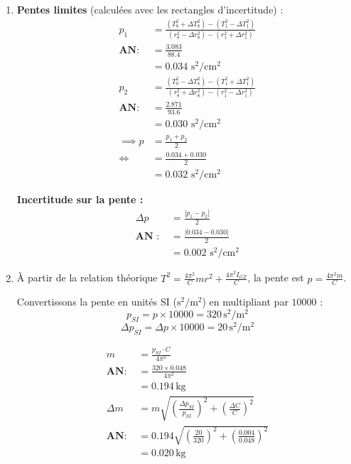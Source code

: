 \begin{enumerate}
    \item 
    \textbf{Pentes limites} (calculées avec les rectangles d'incertitude) :
    \begin{align*}
    p_1 &= \frac{(T^2_8 + \Delta T^2_8) - (T^2_1 - \Delta T^2_1)}{(r^2_8 - \Delta r^2_8) - (r^2_1 + \Delta r^2_1)}  \\
    \textbf{AN: } & = \frac{3.083}{88.4} \\
    & = 0.034 \text{ s}^2/\text{cm}^2\\
    p_2 &= \frac{(T^2_8 - \Delta T^2_8) - (T^2_1 + \Delta T^2_1)}{(r^2_8 + \Delta r^2_8) - (r^2_1 - \Delta r^2_1)}  \\
    \textbf{AN: } & = \frac{2.871}{93.6} \\
    & = 0.030 \text{ s}^2/\text{cm}^2\\
    \implies p & = \frac{p_1 + p_2}{2} \\
    \iff & = \frac{0.034 + 0.030}{2} \\
    & = 0.032 \text{ s}^2/\text{cm}^2
    \end{align*}
    
    \textbf{Incertitude sur la pente :}
    \begin{align*}
        \Delta p & = \frac{|p_1 - p_2|}{2} \\
        \textbf{AN :  } & = \frac{|0.034 - 0.030|}{2} \\
        &  = 0.002\text{ s}^2/\text{cm}^2
    \end{align*}    
    
    \item À partir de la relation théorique $T^2 = \frac{4\pi^2}{C} m r^2 + \frac{4\pi^2 I_{GZ}}{C}$, la pente est $p = \frac{4\pi^2 m}{C}$.
    
    Convertissons la pente en unités SI ($\text{s}^2/\text{m}^2$) en multipliant par $10000$ :
    \[ p_{SI} = p \times 10000 = 320 \, \text{s}^2/\text{m}^2 \]
    \[\Delta p_{SI} = \Delta p \times 10000 = 20 \, \text{s}^2/\text{m}^2 \] 

    \begin{align*}
        m & = \frac{p_{SI} \cdot C}{4\pi^2} \\
        \textbf{AN: } & = \frac{320 \times 0.048}{4\pi^2} \\
        & = 0.194 \, \text{kg} \\
        \Delta m & = m \sqrt{\left(\frac{\Delta p_{SI}}{p_{SI}}\right)^2 + \left(\frac{\Delta C}{C}\right)^2} \\
        \textbf{AN: } & = 0.194 \sqrt{\left(\frac{20}{320}\right)^2 + \left(\frac{0.004}{0.048}\right)^2} \\
        & = 0.020 \, \text{kg}
    \end{align*}


\end{enumerate}
